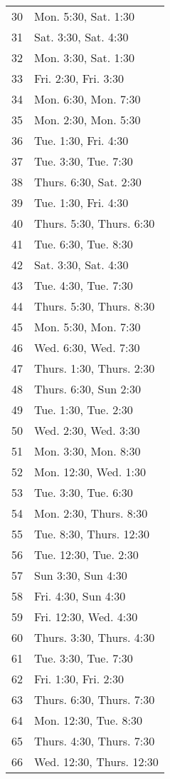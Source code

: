 \documentclass{article}
\begin{document}
\begin{multicols}{2}
\begin{table*}[ht]
\begin{tabular}{ r | l }
30 & Mon. 5:30, Sat. 1:30 \\
31 & Sat. 3:30, Sat. 4:30 \\
32 & Mon. 3:30, Sat. 1:30 \\
33 & Fri. 2:30, Fri. 3:30 \\
34 & Mon. 6:30, Mon. 7:30 \\
35 & Mon. 2:30, Mon. 5:30 \\
36 & Tue. 1:30, Fri. 4:30 \\
37 & Tue. 3:30, Tue. 7:30 \\
38 & Thurs. 6:30, Sat. 2:30 \\
39 & Tue. 1:30, Fri. 4:30 \\
40 & Thurs. 5:30, Thurs. 6:30 \\
41 & Tue. 6:30, Tue. 8:30 \\
42 & Sat. 3:30, Sat. 4:30 \\
43 & Tue. 4:30, Tue. 7:30 \\
44 & Thurs. 5:30, Thurs. 8:30 \\
45 & Mon. 5:30, Mon. 7:30 \\
46 & Wed. 6:30, Wed. 7:30 \\
47 & Thurs. 1:30, Thurs. 2:30 \\
48 & Thurs. 6:30, Sun 2:30 \\
49 & Tue. 1:30, Tue. 2:30 \\
50 & Wed. 2:30, Wed. 3:30 \\
51 & Mon. 3:30, Mon. 8:30 \\
52 & Mon. 12:30, Wed. 1:30 \\
53 & Tue. 3:30, Tue. 6:30 \\
54 & Mon. 2:30, Thurs. 8:30 \\
55 & Tue. 8:30, Thurs. 12:30 \\
56 & Tue. 12:30, Tue. 2:30 \\
57 & Sun 3:30, Sun 4:30 \\
58 & Fri. 4:30, Sun 4:30 \\
59 & Fri. 12:30, Wed. 4:30 \\
60 & Thurs. 3:30, Thurs. 4:30 \\
61 & Tue. 3:30, Tue. 7:30 \\
62 & Fri. 1:30, Fri. 2:30 \\
63 & Thurs. 6:30, Thurs. 7:30 \\
64 & Mon. 12:30, Tue. 8:30 \\
65 & Thurs. 4:30, Thurs. 7:30 \\
66 & Wed. 12:30, Thurs. 12:30 \\
   \end{tabular}
   \\[10pt]
   \caption{\small{  }}
\end{table*}


\end{multicols}
\end{document}
